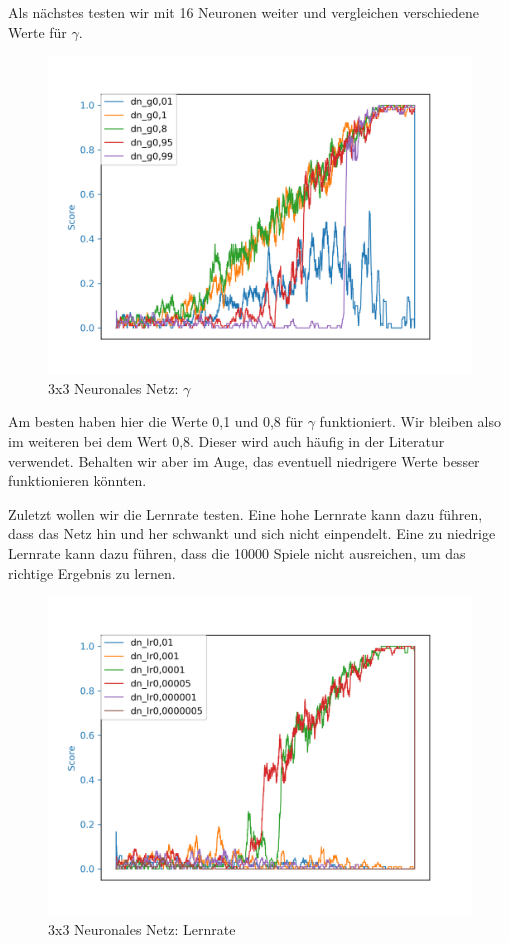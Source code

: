 Als nächstes testen wir mit 16 Neuronen weiter und vergleichen verschiedene Werte für $\gamma$.

\begin{figure}[H]
\centering
\includegraphics[width=\textwidth]{Figures/3x3_dn_g0,01_dn_g0,1_dn_g0,8_dn_g0,95_dn_g0,99.png}
\caption{3x3 Neuronales Netz: $\gamma$}
\label{dn3}
\end{figure}

Am besten haben hier die Werte 0,1 und 0,8 für $\gamma$ funktioniert. Wir bleiben also im weiteren bei dem Wert 0,8. Dieser wird auch häufig in der Literatur verwendet. Behalten wir aber im Auge, das eventuell niedrigere Werte besser funktionieren könnten.

Zuletzt wollen wir die Lernrate testen. Eine hohe Lernrate kann dazu führen, dass das Netz hin und her schwankt und sich nicht einpendelt. Eine zu niedrige Lernrate kann dazu führen, dass die 10000 Spiele nicht ausreichen, um das richtige Ergebnis zu lernen.

\begin{figure}[H]
\centering
\includegraphics[width=\textwidth]{Figures/3x3_dn_lr0,01_dn_lr0,001_dn_lr0,0001_dn_lr0,00005_dn_lr0,000001_dn_lr0,0000005.png}
\caption{3x3 Neuronales Netz: Lernrate}
\label{dn4}
\end{figure}

